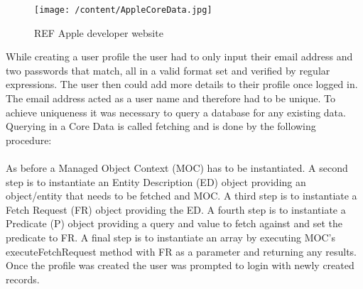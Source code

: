 \documentclass[12pt, a4paper]{report}   %
\begin{document}
\begin{enumerate}
\begin{figure}[H]
  \centering
	\texttt{[image: /content/AppleCoreData.jpg]}
	  \caption{REF Apple developer website}
\end{figure}


While creating a user profile the user had to only input their email address and two passwords that match, all in a valid format set and verified by regular expressions. The user then could add more details to their profile once logged in. The email address acted as a user name and therefore had to be unique. To achieve uniqueness it was necessary to query a database for any existing data. Querying in a Core Data is called fetching and is done by the following procedure:\\ \\
As before a Managed Object Context (MOC) has to be instantiated. A second step is to instantiate an Entity Description (ED) object providing an object/entity that needs to be fetched and MOC. A third step is to instantiate a Fetch Request (FR) object providing the ED. A fourth step is to instantiate a Predicate (P) object providing a query and value to fetch against and set the predicate to FR. A final step is to instantiate an array by executing MOC's executeFetchRequest method with FR as a parameter and returning any results.
Once the profile was created the user was prompted to login with newly created records.



\end{enumerate}
\end{document}
